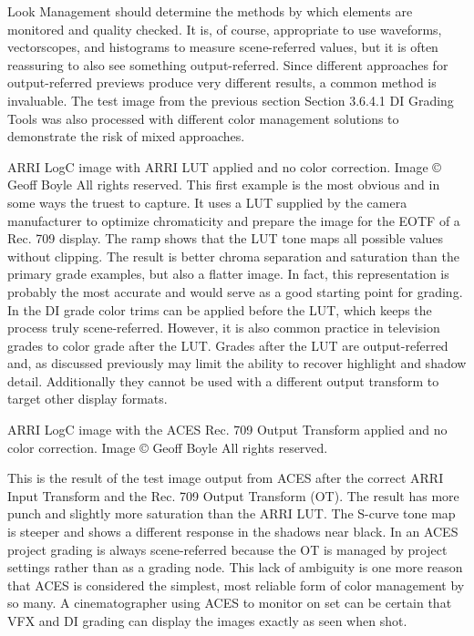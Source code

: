 Look Management should determine the methods by which elements are monitored and quality checked. It is, of course, appropriate to use waveforms, vectorscopes, and histograms to measure scene-referred values, but it is often reassuring to also see something output-referred. Since different approaches for output-referred previews produce very different results, a common method is invaluable. The test image from the previous section Section 3.6.4.1 DI Grading Tools was also processed with different color management solutions to demonstrate the risk of mixed approaches.


ARRI LogC image with ARRI LUT applied and no color correction.  Image © Geoff Boyle All rights reserved.
This first example is the most obvious and in some ways the truest to capture. It uses a LUT supplied by the camera manufacturer to optimize chromaticity and prepare the image for the EOTF of a Rec. 709 display. The ramp shows that the LUT tone maps all possible values without clipping. The result is better chroma separation and saturation than the primary grade examples, but also a flatter image. In fact, this representation is probably the most accurate and would serve as a good starting point for grading. In the DI grade color trims can be applied before the LUT, which keeps the process truly scene-referred. However, it is also common practice in television grades to color grade after the LUT. Grades after the LUT are output-referred and, as discussed previously may limit the ability to recover highlight and shadow detail. Additionally they cannot be used with a different output transform to target other display formats. 


ARRI LogC image with the ACES Rec. 709 Output Transform applied and no color correction.  Image © Geoff Boyle All rights reserved.


This is the result of the test image output from ACES after the correct ARRI Input Transform and the Rec. 709 Output Transform (OT). The result has more punch and slightly more saturation than the ARRI LUT. The S-curve tone map is steeper and shows a different response in the shadows near black. In an ACES project grading is always scene-referred because the OT is managed by project settings rather than as a grading node. This lack of ambiguity is one more reason that ACES is considered the simplest, most reliable form of color management by so many. A cinematographer using ACES to monitor on set can be certain that VFX and DI grading can display the images exactly as seen when shot.



